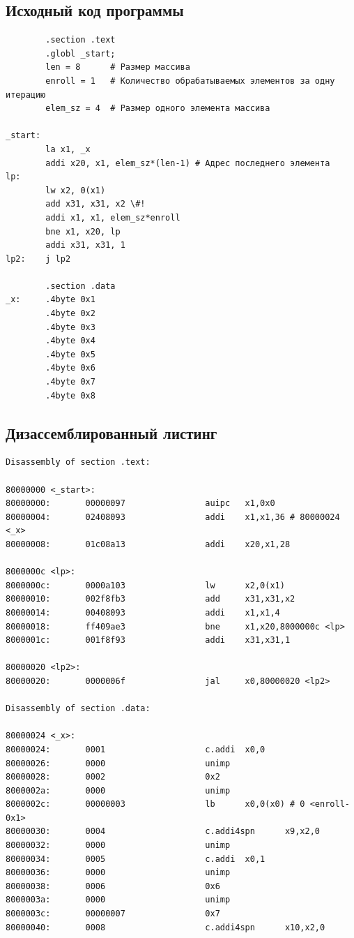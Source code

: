 \subsection{Исходный код программы}

\begin{lstlisting}
		.section .text
		.globl _start;
		len = 8      # Размер массива
		enroll = 1   # Количество обрабатываемых элементов за одну итерацию
		elem_sz = 4  # Размер одного элемента массива
	
_start:
		la x1, _x
		addi x20, x1, elem_sz*(len-1) # Адрес последнего элемента
lp:
		lw x2, 0(x1)
		add x31, x31, x2 \#!
		addi x1, x1, elem_sz*enroll
		bne x1, x20, lp
		addi x31, x31, 1
lp2: 	j lp2

		.section .data
_x:     .4byte 0x1
		.4byte 0x2
		.4byte 0x3
		.4byte 0x4
		.4byte 0x5
		.4byte 0x6
		.4byte 0x7
		.4byte 0x8
\end{lstlisting}

\pagebreak

\subsection{Дизассемблированный листинг}

\begin{lstlisting}
Disassembly of section .text:

80000000 <_start>:
80000000:       00000097                auipc   x1,0x0
80000004:       02408093                addi    x1,x1,36 # 80000024 <_x>
80000008:       01c08a13                addi    x20,x1,28

8000000c <lp>:
8000000c:       0000a103                lw      x2,0(x1)
80000010:       002f8fb3                add     x31,x31,x2
80000014:       00408093                addi    x1,x1,4
80000018:       ff409ae3                bne     x1,x20,8000000c <lp>
8000001c:       001f8f93                addi    x31,x31,1

80000020 <lp2>:
80000020:       0000006f                jal     x0,80000020 <lp2>

Disassembly of section .data:

80000024 <_x>:
80000024:       0001                    c.addi  x0,0
80000026:       0000                    unimp
80000028:       0002                    0x2
8000002a:       0000                    unimp
8000002c:       00000003                lb      x0,0(x0) # 0 <enroll-0x1>
80000030:       0004                    c.addi4spn      x9,x2,0
80000032:       0000                    unimp
80000034:       0005                    c.addi  x0,1
80000036:       0000                    unimp
80000038:       0006                    0x6
8000003a:       0000                    unimp
8000003c:       00000007                0x7
80000040:       0008                    c.addi4spn      x10,x2,0
\end{lstlisting}

